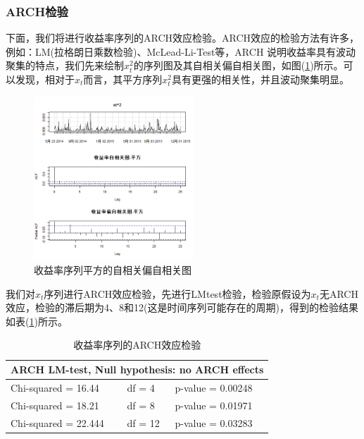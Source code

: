         \subsubsection{ARCH检验}
            \par
            下面，我们将进行收益率序列的ARCH效应检验。ARCH效应的检验方法有许多，例如：LM(拉格朗日乘数检验)、McLead-Li-Test等，ARCH 说明收益率具有波动聚集的特点，我们先来绘制$x_t^2$的序列图及其自相关偏自相关图，如图(\ref{收益率序列平方的自相关偏自相关图})所示。可以发现，相对于$x_t$而言，其平方序列$x_t^2$具有更强的相关性，并且波动聚集明显。
            \begin{figure}[H]
            \centering
            \includegraphics[width = 6cm]{images/rate_of_return_square_autocorrelation_partial_autocorrelation.jpg}
            \caption{收益率序列平方的自相关偏自相关图}
            \label{收益率序列平方的自相关偏自相关图}
            \end{figure}
            我们对$x_t$序列进行ARCH效应检验，先进行LMtest检验，检验原假设为$x_t$无ARCH效应，检验的滞后期为4、8和12(这是时间序列可能存在的周期)，得到的检验结果如表(\ref{收益率序列的ARCH效应检验})所示。
            \begin{table}[H]
            \centering
            \caption{收益率序列的ARCH效应检验}
            \label{收益率序列的ARCH效应检验}
            \begin{tabular}{lll}
                \toprule
            \multicolumn{3}{l}{ARCH LM-test, Null hypothesis: no ARCH effects}\\
            \midrule
            Chi-squared = 16.44 &df = 4 & p-value = 0.00248\\
            Chi-squared = 18.21 &df = 8 & p-value = 0.01971\\
            Chi-squared = 22.444&df = 12& p-value = 0.03283\\
            \bottomrule
            \end{tabular}
            \end{table}
